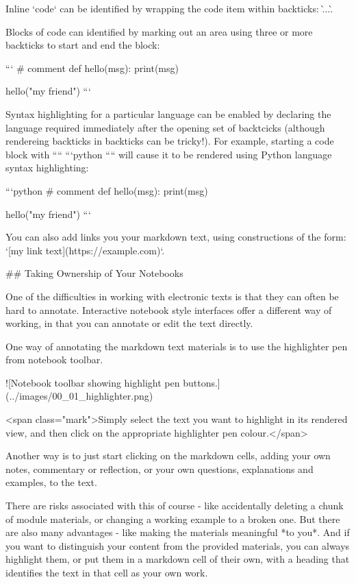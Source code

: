 \documentclass[letterpaper,10pt,english]{sphinxmanual}
\begin{document}
Inline `code` can be identified by wrapping the code item within backticks: \`...\`.

Blocks of code can identified by marking out an area using three or more backticks to start and end the block:

```
# comment
def hello(msg):
    print(msg)

hello("my friend")
```

Syntax highlighting for a particular language can be enabled by declaring the language required immediately after the opening set of backtcicks (although rendereing backticks in backticks can be tricky!). For example, starting a code block with ```` ```python ```` will cause it to be rendered using Python language syntax highlighting:


```python
# comment
def hello(msg):
    print(msg)

hello("my friend")
```

You can also add links you your markdown text, using constructions of the form: `[my link text](https://example.com)`.

## Taking Ownership of Your Notebooks

One of the difficulties in working with electronic texts is that they can often be hard to annotate. Interactive notebook style interfaces offer a different way of working, in that you can annotate or edit the text directly.

One way of annotating the markdown text materials is to use the highlighter pen from notebook toolbar.

![Notebook toolbar showing highlight pen buttons.](../images/00_01_highlighter.png)


<span class="mark">Simply select the text you want to highlight in its rendered view, and then click on the appropriate highlighter pen colour.</span>

Another way is to just start clicking on the markdown cells, adding your own notes, commentary or reflection, or your own questions, explanations and examples, to the text.

There are risks associated with this of course - like accidentally deleting a chunk of module materials, or changing a working example to a broken one. But there are also many advantages - like making the materials meaningful *to you*. And if you want to distinguish your content from the provided materials, you can always highlight them, or put them in a markdown cell of their own, with a heading that identifies the text in that cell as your own work.
\end{document}
